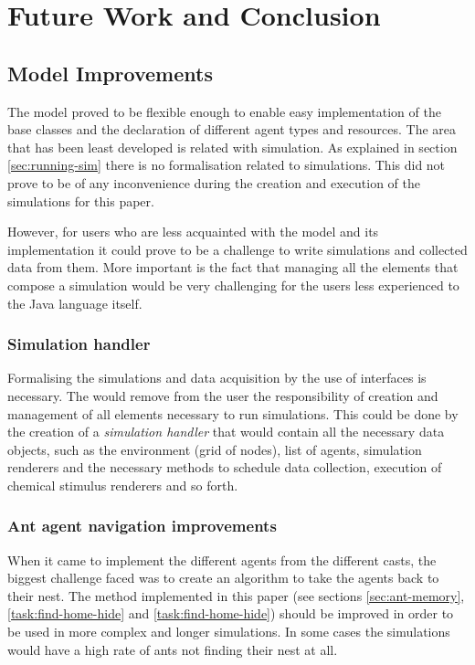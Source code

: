 \chapter{Future Work and Conclusion}
\label{ch:future-work}

\section{Model Improvements}

The model proved to be flexible enough to enable easy implementation of the base classes and the declaration of different agent types and resources. The area that has been least developed is related with simulation. As explained in section \ref{sec:running-sim} there is no formalisation related to simulations. This did not prove to be of any inconvenience during the creation and execution of the simulations for this paper. 

However, for users who are less acquainted with the model and its implementation it could prove to be a challenge to write simulations and collected data from them. More important is the fact that managing all the elements that compose a simulation would be very challenging for the users less experienced to the Java language itself.

\subsection{Simulation handler}

Formalising the simulations and data acquisition by the use of interfaces is necessary. The would remove from the user the responsibility of creation and management of all elements necessary to run simulations. This could be done by the creation of a \emph{simulation handler} that would contain all the necessary data objects, such as the environment (grid of nodes), list of agents, simulation renderers and the necessary methods to schedule data collection, execution of chemical stimulus renderers and so forth.

\subsection{Ant agent navigation improvements}

When it came to implement the different agents from the different casts, the biggest challenge faced was to create an algorithm to take the agents back to their nest. The method implemented in this paper (see sections \ref{sec:ant-memory}, \ref{task:find-home-hide} and \ref{task:find-home-hide}) should be improved in order to be used in more complex and longer simulations. In some cases the simulations would have a high rate of ants not finding their nest at all.

